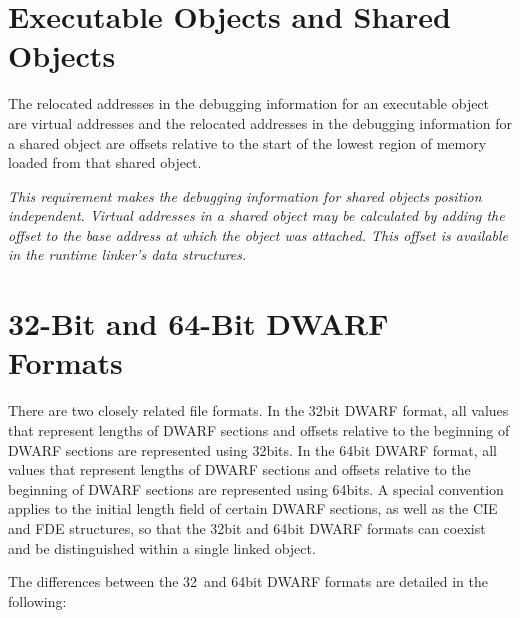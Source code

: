 \section{Executable Objects and Shared Objects} 
\label{datarep:executableobjectsandsharedobjects}

The relocated addresses in the debugging information for an
executable object are virtual addresses and the relocated
addresses in the debugging information for a shared object
are offsets relative to the start of the lowest region of
memory loaded from that shared object.

\textit{This requirement makes the debugging information for
shared objects position independent.  Virtual addresses in a
shared object may be calculated by adding the offset to the
base address at which the object was attached. This offset
is available in the run\dash time linker’s data structures.}



\section{32-Bit and 64-Bit DWARF Formats}
\label{datarep:32bitand64bitdwarfformats}

There are two closely related file formats. In the 32\dash bit DWARF
format, all values that represent lengths of DWARF sections
and offsets relative to the beginning of DWARF sections are
represented using 32\dash bits. In the 64\dash bit DWARF format, all
values that represent lengths of DWARF sections and offsets
relative to the beginning of DWARF sections are represented
using 64\dash bits. A special convention applies to the initial
length field of certain DWARF sections, as well as the CIE and
FDE structures, so that the 32\dash bit and 64\dash bit DWARF formats
can coexist and be distinguished within a single linked object.

The differences between the 32\dash\   and 64\dash bit 
DWARF formats are
detailed in the following:


